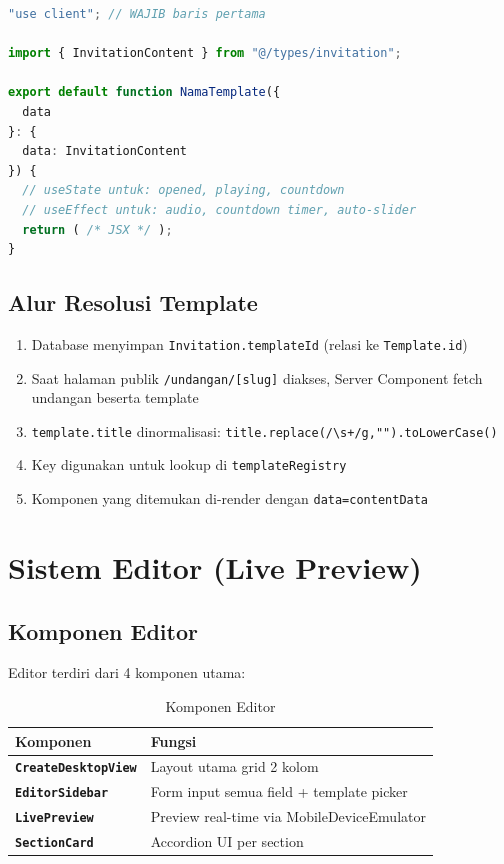 \documentclass[12pt,a4paper]{article}
\begin{document}
\begin{lstlisting}[language=typescript, caption=Struktur Template Wajib]
"use client"; // WAJIB baris pertama

import { InvitationContent } from "@/types/invitation";

export default function NamaTemplate({
  data
}: {
  data: InvitationContent
}) {
  // useState untuk: opened, playing, countdown
  // useEffect untuk: audio, countdown timer, auto-slider
  return ( /* JSX */ );
}
\end{lstlisting}

\subsection{Alur Resolusi Template}

\begin{enumerate}
  \item Database menyimpan \texttt{Invitation.templateId} (relasi ke \texttt{Template.id})
  \item Saat halaman publik \texttt{/undangan/[slug]} diakses, Server Component fetch undangan beserta template
  \item \texttt{template.title} dinormalisasi: \texttt{title.replace(/\textbackslash s+/g,"").toLowerCase()}
  \item Key digunakan untuk lookup di \texttt{templateRegistry}
  \item Komponen yang ditemukan di-render dengan \texttt{data={contentData}}
\end{enumerate}

\section{Sistem Editor (Live Preview)}

\subsection{Komponen Editor}

Editor terdiri dari 4 komponen utama:

\begin{table}[h]
\centering
\begin{tabular}{>{\bfseries}l l}
\toprule
Komponen & Fungsi \\
\midrule
\texttt{CreateDesktopView} & Layout utama grid 2 kolom \\
\texttt{EditorSidebar}     & Form input semua field + template picker \\
\texttt{LivePreview}       & Preview real-time via MobileDeviceEmulator \\
\texttt{SectionCard}       & Accordion UI per section \\
\bottomrule
\end{tabular}
\caption{Komponen Editor}
\end{table}
\end{document}
